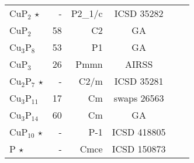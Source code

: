 \begin{tabular}{l r r c l l}
        CuP$_\text{2}$          $\star$   &          -           &       P2_1/c        &           ICSD 35282           &                                \\
        CuP$_\text{2}$                    &          58          &          C2          &               GA               &                                \\
  Cu$_\text{3}$P$_\text{8}$               &          53          &          P1          &               GA               &                                \\
        CuP$_\text{3}$                    &          26          &         Pmmn         &             AIRSS              &                                \\
  Cu$_\text{2}$P$_\text{7}$     $\star$   &          -           &        C2/m         &           ICSD 35281           &                                \\
  Cu$_\text{3}$P$_\text{11}$              &          17          &          Cm          &          swaps 26563           &                                \\
  Cu$_\text{3}$P$_\text{14}$              &          60          &          Cm          &               GA               &                                \\
       CuP$_\text{10}$          $\star$   &          -           &        P-1          &          ICSD 418805           &                                \\
              P                 $\star$   &          -           &        Cmce         &          ICSD 150873           &                                \\
\end{tabular}